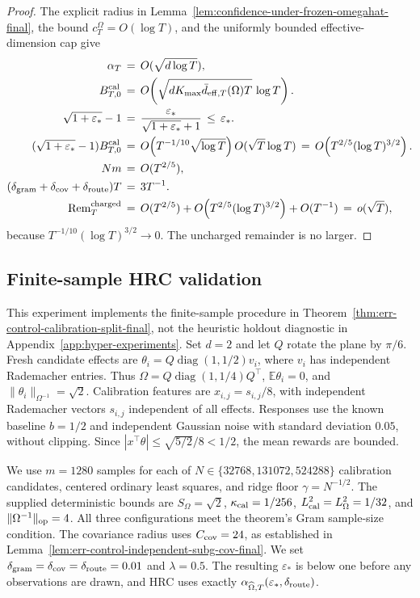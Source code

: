 \documentclass{article} %
\begin{document}
\begin{proof}
The explicit radius in
Lemma~\ref{lem:confidence-under-frozen-omegahat-final}, the bound
\(c_T^\Omega=O(\log T)\), and the uniformly bounded effective-dimension cap
give
\begin{equation}
\begin{aligned}
\alpha_T
&\,=\,
O(\sqrt{d\log T}),
\\
B_{T,0}^{\rm cal}
&\,=\,
O\!\left(
\sqrt{dK_{\max}\bar d_{\mathrm{eff},T}(\Omega)T}\,\log T
\right).
\\
\sqrt{1+\varepsilon_*}-1
&\,=\,
\frac{\varepsilon_*}{\sqrt{1+\varepsilon_*}+1}
\,\leq\,
\varepsilon_*.
\\
(\sqrt{1+\varepsilon_*}-1)B_{T,0}^{\rm cal}
&\,=\,
O\!\left(T^{-1/10}\sqrt{\log T}\right)
O(\sqrt{T}\log T)
\,=\,
O\!\left(T^{2/5}(\log T)^{3/2}\right).
\\
Nm
&\,=\,
O(T^{2/5}),
\\
(\delta_{\rm gram}+\delta_{\rm cov}+\delta_{\rm route})T
&\,=\,
3T^{-1}.
\\
\operatorname{Rem}_T^{\rm charged}
&\,=\,
O(T^{2/5})
+
O\!\left(T^{2/5}(\log T)^{3/2}\right)
+
O(T^{-1})
\,=\,
o(\sqrt T),
\end{aligned}
\end{equation}
because
\(T^{-1/10}(\log T)^{3/2}\to0\). The uncharged remainder is no larger.
\end{proof}

\subsection{Finite-sample HRC validation}
\label{app:hrc-validation}

This experiment implements the finite-sample procedure in
Theorem~\ref{thm:err-control-calibration-split-final}, not the heuristic
holdout diagnostic in Appendix~\ref{app:hyper-experiments}.
Set $d=2$ and let $Q$ rotate the plane by $\pi/6$.
Fresh candidate effects are
$\theta_i=Q\operatorname{diag}(1,1/2)v_i$, where $v_i$ has independent
Rademacher entries. Thus
$\Omega=Q\operatorname{diag}(1,1/4)Q^\top$,
$\mathbb E\theta_i=0$, and $\|\theta_i\|_{\Omega^{-1}}=\sqrt2$.
Calibration features are $x_{i,j}=s_{i,j}/8$, with independent
Rademacher vectors $s_{i,j}$ independent of all effects.
Responses use the known baseline $b=1/2$ and independent
Gaussian noise with standard deviation $0.05$, without clipping.
Since $|x^\top\theta|\leq\sqrt{5/2}/8<1/2$, the mean rewards are bounded.

We use $m=1280$ samples for each of
$N\in\{32768,131072,524288\}$ calibration candidates, centered ordinary
least squares, and ridge floor $\gamma=N^{-1/2}$.
The supplied deterministic bounds are
$S_\Omega=\sqrt2$, $\kappa_{\rm cal}=1/256$,
$L_{\rm cal}^2=L_\Omega^2=1/32$, and
$\|\Omega^{-1}\|_{\rm op}=4$.
All three configurations meet the theorem's Gram sample-size condition.
The covariance radius uses $C_{\rm cov}=24$, as established in
Lemma~\ref{lem:err-control-independent-subg-cov-final}.
We set $\delta_{\rm gram}=\delta_{\rm cov}=\delta_{\rm route}=0.01$
and $\lambda=0.5$.
The resulting $\varepsilon_*$ is below one before any observations are
drawn, and HRC uses exactly
$\alpha_{\widehat\Omega,T}(\varepsilon_*,\delta_{\rm route})$.
\end{document}
